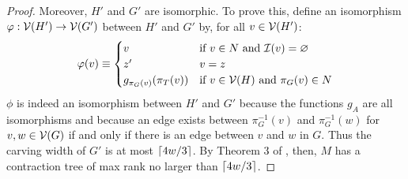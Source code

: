 \begin{proof}
Moreover, $H'$ and $G'$ are isomorphic. To prove this, define an isomorphism $\varphi: \mathcal{V}(H') \rightarrow \mathcal{V}(G')$ between $H'$ and $G'$ by, for all $v \in \mathcal{V}(H')$:
$$\varphi(v) \equiv \begin{cases}v&\text{if}~v \in N~\text{and}~\mathcal{I}(v)=\varnothing\\z'&v=z\\g_{\pi_G(v)}(\pi_T(v))&\text{if}~v \in \mathcal{V}(H)~\text{and}~\pi_G(v) \in N\end{cases}$$
$\phi$ is indeed an isomorphism between $H'$ and $G'$ because the functions $g_A$ are all isomorphisms and because an edge exists between $\pi_G^{-1}(v)$ and $\pi_G^{-1}(w)$ for $v, w \in \mathcal{V}(G)$ if and only if there is an edge between $v$ and $w$ in $G$. Thus the carving width of $G'$ is at most $\lceil4w/3\rceil$. By Theorem 3 of \cite{DDV19}, then, $M$ has a contraction tree of max rank no larger than $\lceil4w/3\rceil$.
\end{proof}